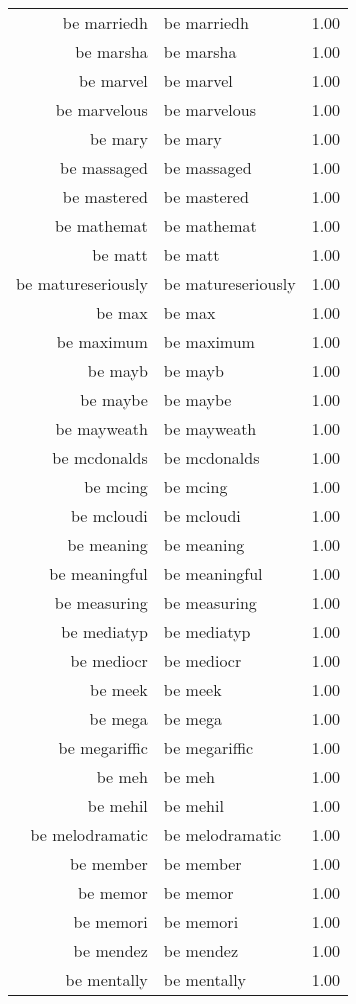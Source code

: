 \begin{table}[ht]
\begin{tabular}{rlr}
  be marriedh & be marriedh & 1.00 \\ 
  be marsha & be marsha & 1.00 \\ 
  be marvel & be marvel & 1.00 \\ 
  be marvelous & be marvelous & 1.00 \\ 
  be mary & be mary & 1.00 \\ 
  be massaged & be massaged & 1.00 \\ 
  be mastered & be mastered & 1.00 \\ 
  be mathemat & be mathemat & 1.00 \\ 
  be matt & be matt & 1.00 \\ 
  be matureseriously & be matureseriously & 1.00 \\ 
  be max & be max & 1.00 \\ 
  be maximum & be maximum & 1.00 \\ 
  be mayb & be mayb & 1.00 \\ 
  be maybe & be maybe & 1.00 \\ 
  be mayweath & be mayweath & 1.00 \\ 
  be mcdonalds & be mcdonalds & 1.00 \\ 
  be mcing & be mcing & 1.00 \\ 
  be mcloudi & be mcloudi & 1.00 \\ 
  be meaning & be meaning & 1.00 \\ 
  be meaningful & be meaningful & 1.00 \\ 
  be measuring & be measuring & 1.00 \\ 
  be mediatyp & be mediatyp & 1.00 \\ 
  be mediocr & be mediocr & 1.00 \\ 
  be meek & be meek & 1.00 \\ 
  be mega & be mega & 1.00 \\ 
  be megariffic & be megariffic & 1.00 \\ 
  be meh & be meh & 1.00 \\ 
  be mehil & be mehil & 1.00 \\ 
  be melodramatic & be melodramatic & 1.00 \\ 
  be member & be member & 1.00 \\ 
  be memor & be memor & 1.00 \\ 
  be memori & be memori & 1.00 \\ 
  be mendez & be mendez & 1.00 \\ 
  be mentally & be mentally & 1.00 \\ 

\end{tabular}
\end{table}
